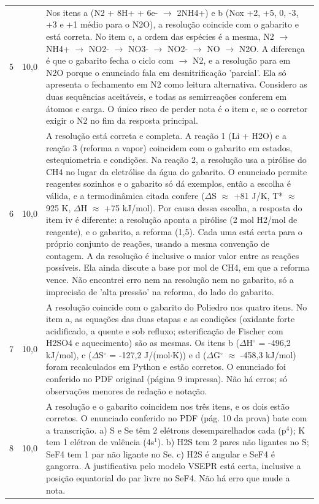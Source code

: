 \documentclass{article}%
\begin{document}
\begin{longtable}{@{}c c p{}@{}}
5 & 10,0 & Nos itens a (N2 + 8H+ + 6e- $\to$ 2NH4+) e b (Nox +2, +5, 0, -3, +3 e +1 médio para o N2O), a resolução coincide com o gabarito e está correta. No item c, a ordem das espécies é a mesma, N2 $\to$ NH4+ $\to$ NO2- $\to$ NO3- $\to$ NO2- $\to$ NO $\to$ N2O. A diferença é que o gabarito fecha o ciclo com $\to$ N2, e a resolução para em N2O porque o enunciado fala em desnitrificação 'parcial'. Ela só apresenta o fechamento em N2 como leitura alternativa. Considero as duas sequências aceitáveis, e todas as semirreações conferem em átomos e carga. O único risco de perder nota é o item c, se o corretor exigir o N2 no fim da resposta principal. \\
6 & 10,0 & A resolução está correta e completa. A reação 1 (Li + H2O) e a reação 3 (reforma a vapor) coincidem com o gabarito em estados, estequiometria e condições. Na reação 2, a resolução usa a pirólise do CH4 no lugar da eletrólise da água do gabarito. O enunciado permite reagentes sozinhos e o gabarito só dá exemplos, então a escolha é válida, e a termodinâmica citada confere ($\Delta$S $\approx$ +81 J/K, T* $\approx$ 925 K, $\Delta$H $\approx$ +75 kJ/mol). Por causa dessa escolha, a resposta do item iv é diferente: a resolução aponta a pirólise (2 mol H2/mol de reagente), e o gabarito, a reforma (1,5). Cada uma está certa para o próprio conjunto de reações, usando a mesma convenção de contagem. A da resolução é inclusive o maior valor entre as reações possíveis. Ela ainda discute a base por mol de CH4, em que a reforma vence. Não encontrei erro nem na resolução nem no gabarito, só a imprecisão de 'alta pressão' na reforma, do lado do gabarito. \\
7 & 10,0 & A resolução coincide com o gabarito do Poliedro nos quatro itens. No item a, as equações das duas etapas e as condições (oxidante forte acidificado, a quente e sob refluxo; esterificação de Fischer com H2SO4 e aquecimento) são as mesmas. Os itens b ($\Delta$H$^\circ$ = -496,2 kJ/mol), c ($\Delta$S$^\circ$ = -127,2 J/(mol$\cdot$K)) e d ($\Delta$G$^\circ$ $\approx$ -458,3 kJ/mol) foram recalculados em Python e estão corretos. O enunciado foi conferido no PDF original (página 9 impressa). Não há erros; só observações menores de redação e notação. \\
8 & 10,0 & A resolução e o gabarito coincidem nos três itens, e os dois estão corretos. O enunciado conferido no PDF (pág. 10 da prova) bate com a transcrição. a) S e Se têm 2 elétrons desemparelhados cada (p$^{4}$); K tem 1 elétron de valência (4s$^{1}$). b) H2S tem 2 pares não ligantes no S; SeF4 tem 1 par não ligante no Se. c) H2S é angular e SeF4 é gangorra. A justificativa pelo modelo VSEPR está certa, inclusive a posição equatorial do par livre no SeF4. Não há erro que mude a nota. \\

\end{longtable}
\end{document}
